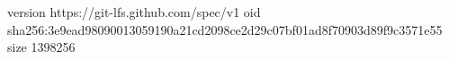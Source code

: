 version https://git-lfs.github.com/spec/v1
oid sha256:3e9ead98090013059190a21cd2098ce2d29c07bf01ad8f70903d89f9c3571e55
size 1398256
